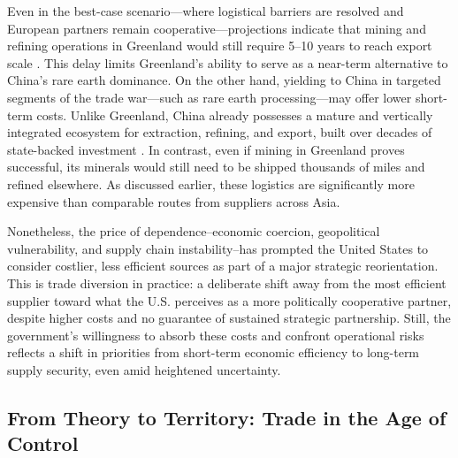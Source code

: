 \documentclass{adonis}
\begin{document}
     Even in the best-case scenario—where logistical barriers are resolved and European partners remain cooperative—projections indicate that mining and refining operations in Greenland would still require 5–10 years to reach export scale \citep{greenland2025strategy}. This delay limits Greenland’s ability to serve as a near-term alternative to China’s rare earth dominance. On the other hand, yielding to China in targeted segments of the trade war—such as rare earth processing—may offer lower short-term costs. Unlike Greenland, China already possesses a mature and vertically integrated ecosystem for extraction, refining, and export, built over decades of state-backed investment \citep{holslag2022controlling}. In contrast, even if mining in Greenland proves successful, its minerals would still need to be shipped thousands of miles and refined elsewhere. As discussed earlier, these logistics are significantly more expensive than comparable routes from suppliers across Asia. 
     
     Nonetheless, the price of dependence–economic coercion, geopolitical vulnerability, and supply chain instability–has prompted the United States to consider costlier, less efficient sources as part of a major strategic reorientation. This is trade diversion in practice: a deliberate shift away from the most efficient supplier toward what the U.S. perceives as a more politically cooperative partner, despite higher costs and no guarantee of sustained strategic partnership. Still, the government’s willingness to absorb these costs and confront operational risks reflects a shift in priorities from short-term economic efficiency to long-term supply security, even amid heightened uncertainty.

    \subsection*{From Theory to Territory: Trade in the Age of Control}
\end{document}
